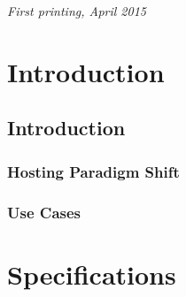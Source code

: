 \documentclass[11pt,fleqn]{book} %
\begin{document}
\noindent \textit{First printing, April 2015} %



\pagestyle{empty} %

\tableofcontents %

\cleardoublepage %

\pagestyle{fancy} %

\part{Introduction}



\chapter{Introduction}

\section{Hosting Paradigm Shift}
\section{Use Cases}

\part{Specifications}
\end{document}
